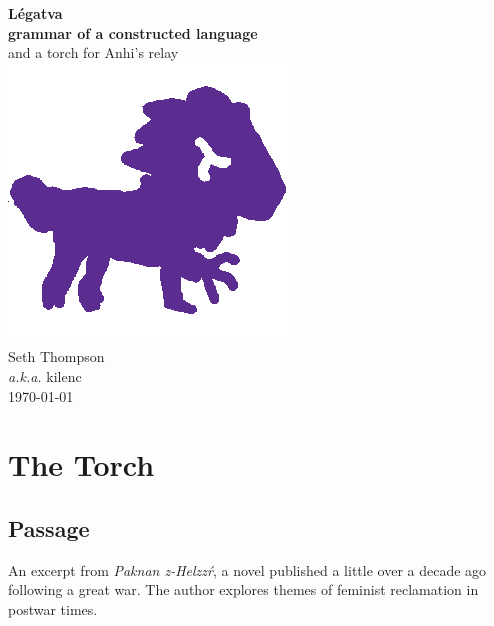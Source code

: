\documentclass[fontsize=12pt,twoside=false,numbers=noenddot]{class/kaobook}
\title[\langname{} Grammar]{\langname{}}
\subtitle{a grammar of a constructed language}
\author{kilenc}
\date{\today}
\newcommand{\langname}{\textbf{Légatva}}
\newcommand{\rzc}{\color[HTML]{5B2D90}}
\newcommand{\rz}[1]{\textit{\rzc #1}}
\renewcommand{\bf}{\bfseries}
\begin{document}
\frontmatter

\begin{titlepage} \centering
	\hspace{0pt} \vfill
	{\huge \langname{} } \\\medbreak 
	{\large \bf grammar of a constructed language} \\
	{\small and a torch for Anhi's relay}\\ \bigbreak
	\includegraphics[width=0.25\linewidth]{lang2-lion.png} \\\bigbreak
	{\large Seth Thompson \\ \small \emph{a.k.a.} kilenc} \\\bigbreak
	{\small \today}
	\vfill \hspace{0pt}
\end{titlepage}

\setlength{\textheight}{23cm} %
\etocstandarddisplaystyle %
\etocstandardlines %
\tableofcontents 

\mainmatter

\chapter{The Torch}
\section{Passage}
An excerpt from \rz{Paknan z-Helzzŕ}, a novel published a little over a decade ago following a great war. The author explores themes of feminist reclamation in postwar times.
\end{document}

